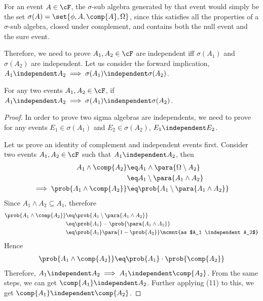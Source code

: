 \documentclass[a4paper,10pt]{article}
\begin{document}
\begin{question}

	For an event $A \in \cF$, the $\sigma$-sub algebra generated by that event would simply be the set $\sigma(A) = \set{\phi, A, \comp{A}, \Omega}$, since this satisfies all the properties of a $\sigma$-sub algebra, \ie closed under complement, and contains both the null event and the sure event.

	Therefore, we need to prove $A_1, A_2 \in \cF$ are independent iff $\sigma(A_1)$ and $\sigma(A_2)$ are independent. Let us consider the forward implication, \ie $A_1 \independent A_2 \implies \sigma(A_1) \independent \sigma(A_2)$.

	\begin{claim}
		\label{claim:1.2}
		For any two events $A_1, A_2 \in \cF$, if $A_1 \independent A_2 \implies \sigma(A_1) \indenpendent \sigma(A_2)$.
		\begin{proof}
			In order to prove two sigma algebras are independents, we need to prove for any events $E_1 \in \sigma(A_1)$ and $E_2 \in \sigma(A_2)$, $E_1 \independent E_2$.

			Let us prove an identity of complement and independent events first. Consider two events $A_1, A_2 \in \cF$ such that $A_1 \independent A_2$, then
			\begin{align*}
				A_1 \land \comp{A_2}	&\eq	A_1 \land \para{\Omega \setminus A_2} \\
				&\eq	A_1 \setminus \para{A_1 \land A_2} \\
				\implies \prob{A_1 \land \comp{A_2}}	&\eq	\prob{A_1 \setminus \para{A_1 \land A_2}}
			\end{align*}
			Since $A_1 \land A_2 \subseteq A_1$, therefore
			\begin{align*}
				\prob{A_1 \land \comp{A_2}}	&\eq	\prob{A_1 \setminus \para{A_1 \land A_2}} \\
				&\eq	\prob{A_1} - \prob{\para{A_1 \land A_2}} \\
				&\eq	\prob{A_1} \para{1 - \prob{A_2}} \mcmnt{as $A_1 \independent A_2$}
			\end{align*}
			Hence
			\begin{align}
				\prob{A_1 \land \comp{A_2}}	\eq	\prob{A_1} \cdot \prob{\comp{A_2}}
			\end{align}
			Therefore, $A_1 \independent A_2 \implies A_1 \independent \comp{A_2}$. From the same steps, we can get $\comp{A_1} \independent A_2$. Further applying (11) to this, we get $\comp{A_1} \independent \comp{A_2}$.


\end{proof}
\end{claim}
\end{question}
\end{document}
